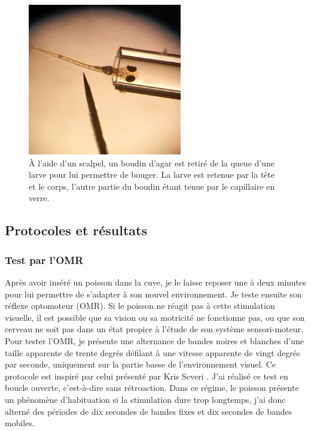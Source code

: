 \begin{figure}
\centering
\includegraphics[width=0.6\textwidth]{./files/prepa_larve.png}
\caption{À l'aide d'un scalpel, un boudin d'agar est retiré de la queue d'une larve pour lui permettre de bouger. La larve est retenue par la tête et le corps, l'autre partie du boudin étant tenue par le capillaire en verre. }
\end{figure}

\subsection{Protocoles et résultats}

\subsubsection{Test par l'OMR}
Après avoir inséré un poisson dans la cuve, je le laisse reposer une à deux minutes pour lui permettre de s'adapter à son nouvel environnement. Je teste ensuite son réflexe optomoteur (OMR). Si le poisson ne réagit pas à cette stimulation visuelle, il est possible que sa vision ou sa motricité ne fonctionne pas, ou que son cerveau ne soit pas dans un état propice à l'étude de son système sensori-moteur. Pour tester l'OMR, je présente une alternance de bandes noires et blanches d'une taille apparente de trente degrés défilant à une vitesse apparente de vingt degrés par seconde, uniquement sur la partie basse de l'environnement visuel. Ce protocole est inspiré par celui présenté par Kris Severi \cite{severi_neural_2014}. J'ai réalisé ce test en boucle ouverte, c'est-à-dire sans rétroaction. Dans ce régime, le poisson présente un phénomène d'habituation si la stimulation dure trop longtemps, j'ai donc alterné des périodes de dix secondes de bandes fixes et dix secondes de bandes mobiles.

